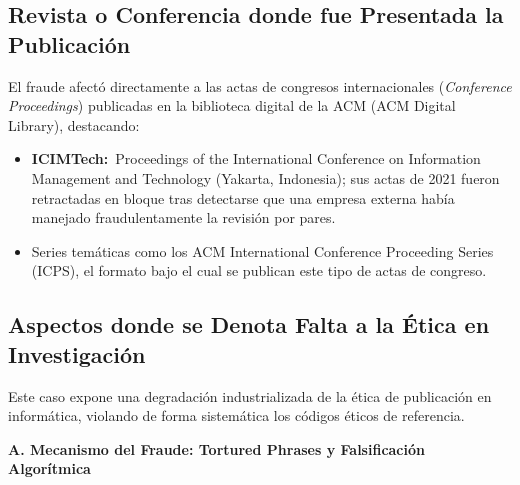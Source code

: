 \documentclass[12pt,a4paper]{article}
\newcommand{\itemlabel}[3]{\textbf{#1#2}~#3}
\begin{document}
\subsection{Revista o Conferencia donde fue Presentada la Publicación}
El fraude afectó directamente a las actas de congresos internacionales (\textit{Conference Proceedings}) publicadas en la biblioteca digital de la ACM (ACM Digital Library), destacando:
\begin{itemize}
\item \itemlabel{ICIMTech}{:}{Proceedings of the International Conference on Information Management and Technology (Yakarta, Indonesia); sus actas de 2021 fueron retractadas en bloque tras detectarse que una empresa externa había manejado fraudulentamente la revisión por pares.}
\item Series temáticas como los ACM International Conference Proceeding Series (ICPS), el formato bajo el cual se publican este tipo de actas de congreso.
\end{itemize}
\subsection{Aspectos donde se Denota Falta a la Ética en Investigación}
Este caso expone una degradación industrializada de la ética de publicación en informática, violando de forma sistemática los códigos éticos de referencia.

\bigskip
\noindent\textbf{A. Mecanismo del Fraude: \textquotedbl{}Tortured Phrases\textquotedbl{} y Falsificación Algorítmica}
\end{document}
